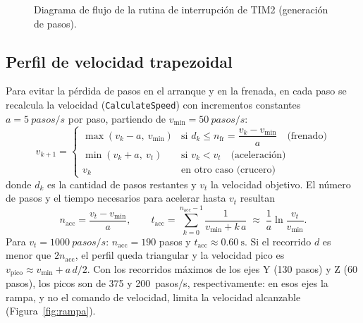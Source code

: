 \begin{figure}[!htbp]
\caption{Diagrama de flujo de la rutina de interrupción de TIM2 (generación de pasos).}\label{fig:flujo-isr}
\end{figure}

\subsection{Perfil de velocidad trapezoidal}
Para evitar la pérdida de pasos en el arranque y en la frenada, en cada paso se recalcula la
velocidad (\texttt{CalculateSpeed}) con incrementos constantes $a=\SI{5}{pasos/s}$ por paso,
partiendo de $v_{\min}=\SI{50}{pasos/s}$:
\begin{equation}
  v_{k+1} =
  \begin{cases}
    \max(v_k - a,\ v_{\min}) & \text{si } d_k \le n_{\mathrm{fr}} = \dfrac{v_k - v_{\min}}{a} \quad\text{(frenado)}\\[6pt]
    \min(v_k + a,\ v_t) & \text{si } v_k < v_t \quad\text{(aceleración)}\\[4pt]
    v_k & \text{en otro caso (crucero)}
  \end{cases}
\end{equation}
donde $d_k$ es la cantidad de pasos restantes y $v_t$ la velocidad objetivo. El número de
pasos y el tiempo necesarios para acelerar hasta $v_t$ resultan
\begin{equation}
  n_{\mathrm{acc}} = \frac{v_t - v_{\min}}{a},
  \qquad
  t_{\mathrm{acc}} = \sum_{k=0}^{n_{\mathrm{acc}}-1}\frac{1}{v_{\min}+k\,a}
  \;\approx\; \frac{1}{a}\ln\frac{v_t}{v_{\min}} .
\end{equation}
Para $v_t=\SI{1000}{pasos/s}$: $n_{\mathrm{acc}}=190$ pasos y $t_{\mathrm{acc}}\approx\SI{0,60}{\second}$.
Si el recorrido $d$ es menor que $2n_{\mathrm{acc}}$, el perfil queda triangular y la
velocidad pico es $v_{\mathrm{pico}}\approx v_{\min}+a\,d/2$. Con los recorridos máximos de los
ejes Y (130 pasos) y Z (60 pasos), los picos son de 375 y \SI{200}{pasos/s}, respectivamente:
en esos ejes la rampa, y no el comando de velocidad, limita la velocidad alcanzable
(Figura~\ref{fig:rampa}).

